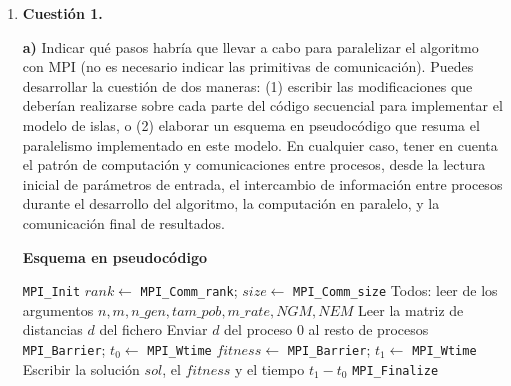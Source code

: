 \documentclass[12pt]{article}
\begin{document}
\begin{enumerate}
	\item \textbf{Cuestión 1.}

\textbf{a)} Indicar qué pasos habría que llevar a cabo para paralelizar el algoritmo con MPI (no es necesario indicar las primitivas de comunicación). Puedes desarrollar la cuestión de dos maneras: (1) escribir las modificaciones que deberían realizarse sobre cada parte del código secuencial para implementar el modelo de islas, o (2) elaborar un esquema en pseudocódigo que resuma el paralelismo implementado en este modelo. En cualquier caso, tener en cuenta el patrón de computación y comunicaciones entre procesos, desde la lectura inicial de parámetros de entrada, el intercambio de información entre procesos durante el desarrollo del algoritmo, la computación en paralelo, y la comunicación final de resultados.


\medskip
\noindent\textbf{Esquema en pseudocódigo}\par
\smallskip
 
\begin{algorithm}[H]
\caption{Programa principal (\texttt{main})}
\begin{algorithmic}[1]
\State \texttt{MPI\_Init}
\State $rank \gets$ \texttt{MPI\_Comm\_rank}; \quad $size \gets$ \texttt{MPI\_Comm\_size}
\State Todos: leer de los argumentos $n, m, n\_gen, tam\_pob, m\_rate, NGM, NEM$
    \State Leer la matriz de distancias $d$ del fichero
\EndIf
\State Enviar $d$ del proceso 0 al resto de procesos
\State \texttt{MPI\_Barrier}; \quad $t_0 \gets$ \texttt{MPI\_Wtime}
\State $fitness \gets$ 
\State \texttt{MPI\_Barrier}; \quad $t_1 \gets$ \texttt{MPI\_Wtime}
    \State Escribir la solución $sol$, el $fitness$ y el tiempo $t_1 - t_0$
\EndIf
\State \texttt{MPI\_Finalize}
\end{algorithmic}
\end{algorithm}
 

\end{enumerate}
\end{document}
